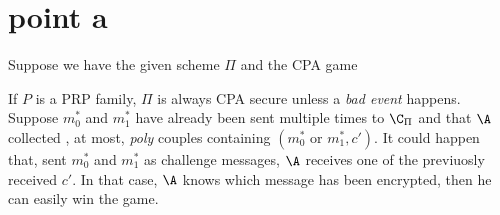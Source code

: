 \section{point a}
Suppose we have the given scheme $\Pi$ and the CPA game

\begin{figure}[h!]
   \centering
   \sdinit{}
\end{figure}


If $P$ is a PRP family, $\Pi$ is always CPA secure unless a \textit{bad event }
happens.\\

Suppose $m^{*}_{0}$ and $m^{*}_{1}$ have already been sent multiple times to
$\C_{\Pi}$ and that $\A$ collected , at most, \textit{poly} couples containing
$(m^{*}_{0} \text{ or } m^{*}_{1}, c' )$. It could happen that, sent  $m^{*}_{0}$ and
$m^{*}_{1}$ as challenge messages, $\A$ receives one of the previuosly received
$c'$. In that case, $\A$ knows which message has been encrypted, then he can
easily win the game.\\

